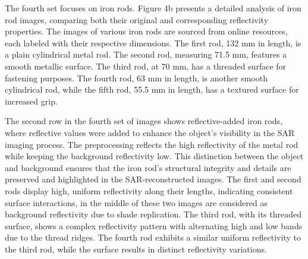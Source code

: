 \documentclass[journal,article,submit,pdftex,moreauthors]{Definitions/mdpi}
\begin{document}




The fourth set focuses on iron rods. Figure 4b presents a detailed analysis of iron rod images, comparing both their original and corresponding reflectivity properties. The images of various iron rods are sourced from online resources, each labeled with their respective dimensions. The first rod, 132 mm in length, is a plain cylindrical metal rod. The second rod, measuring 71.5 mm, features a smooth metallic surface. The third rod, at 70 mm, has a threaded surface for fastening purposes. The fourth rod, 63 mm in length, is another smooth cylindrical rod, while the fifth rod, 55.5 mm in length, has a textured surface for increased grip.


The second row in the fourth set of images shows reflective-added iron rods, where reflective values were added to enhance the object's visibility in the SAR imaging process. The preprocessing reflects the high reflectivity of the metal rod while keeping the background reflectivity low. This distinction between the object and background ensures that the iron rod's structural integrity and details are preserved and highlighted in the SAR-reconstructed images. The first and second rods display high, uniform reflectivity along their lengths, indicating consistent surface interactions, in the middle of these two images are considered as background reflectivity due to shade replication. The third rod, with its threaded surface, shows a complex reflectivity pattern with alternating high and low bands due to the thread ridges. The fourth rod exhibits a similar uniform reflectivity to the third rod, while the surface results in distinct reflectivity variations.
\end{document}
